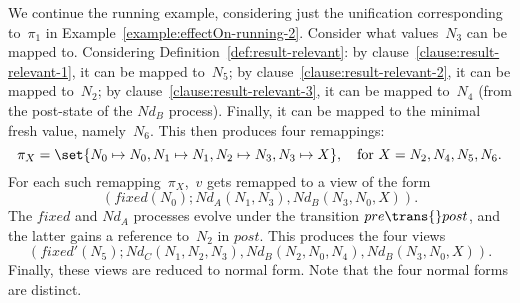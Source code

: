 

\begin{example}
We continue the running example, considering just the unification
corresponding to~$\pi_1$ in Example~\ref{example:effectOn-running-2}.
Consider what values~$N_3$ can be mapped to.  Considering
Definition~\ref{def:result-relevant}: by
clause~\ref{clause:result-relevant-1}, it can be mapped to~$N_5$; by
clause~\ref{clause:result-relevant-2}, it can be mapped to~$N_2$; by
clause~\ref{clause:result-relevant-3}, it can be mapped to~$N_4$ (from the
post-state of the $Nd_B$ process).  Finally, it can be mapped to the minimal
fresh value, namely~$N_6$.
%
This then produces four remappings:
\[
\pi_X = \set{N_0 \mapsto N_0, N_1 \mapsto N_1, N_2 \mapsto N_3, N_3 \mapsto X},
\quad \mbox{for $X = N_2, N_4, N_5, N_6$}.
\]
For each such remapping~$\pi_X$,\, $v$ gets remapped to a view of the form
\[
(fixed(N_0); Nd_A(N_1, N_3), Nd_B(N_3, N_0, X)).
\]
The $fixed$ and $Nd_A$ processes evolve under the transition \( pre
\trans{} post \), and the latter gains a reference to~$N_2$ in
$post$.  This produces the four views
\[
(fixed'(N_5); Nd_C(N_1, N_2, N_3), Nd_B(N_2, N_0, N_4), Nd_B(N_3, N_0, X)).
\]
Finally, these views are reduced to normal form.  Note that the four
normal forms are distinct.
\end{example}



